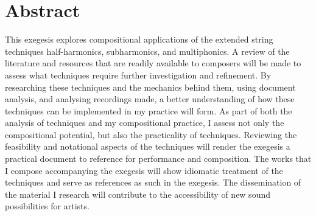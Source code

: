 \chapter*{Abstract}
 
This exegesis explores compositional applications of the extended string techniques half-harmonics, subharmonics, and multiphonics.
A review of the literature and resources that are readily available to composers will be made to assess what techniques require further investigation and refinement. 
By researching these techniques and the mechanics behind them, using document analysis, and analysing recordings made, a better understanding of how these techniques can be implemented in my practice will form. 
As part of both the analysis of techniques and my compositional practice, I assess not only the compositional potential, but also the practicality of techniques. 
Reviewing the feasibility and notational aspects of the techniques will render the exegesis a practical document to reference for performance and composition.
The works that I compose accompanying the exegesis will show idiomatic treatment of the techniques and serve as references as such in the exegesis. 
The dissemination of the material I research will contribute to the accessibility of new sound possibilities for artists. 
